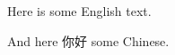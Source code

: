 \documentclass{article}
\begin{document}
 
  Here is some English text.

  And here 你好 some Chinese.
\end{document}
